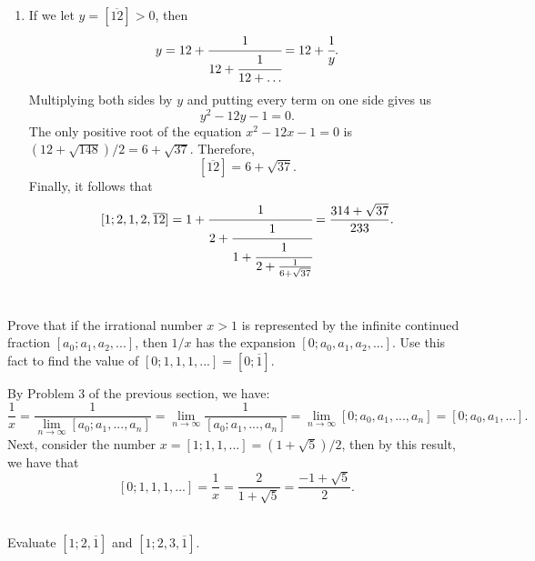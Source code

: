 \begin{solution}
\begin{enumerate}
        $$y^2 - 3y - 3 = 0.$$
        The only positive root of the equation $x^2 - 3x - 3 = 0$ is $(3 + \sqrt{21})/2$. Therefore, 
        $$[\overline{3, 1}] = \frac{3 + \sqrt{21}}{2}.$$
        Finally, it follows that
        $$[1; 2, \overline{3, 1}] = 1 + \cfrac{1}{2 + \frac{1}{[\overline{3, 1}]}} = 1 + \cfrac{1}{2 + \frac{2}{3 + \sqrt{21}}} = \frac{19 - \sqrt{21}}{10}.$$
        \item If we let $y = [\overline{12}] > 0$, then
        $$y = 12 + \cfrac{1}{12 + \cfrac{1}{12 + \dots}} = 12 + \cfrac{1}{y}.$$
        Multiplying both sides by $y$ and putting every term on one side gives us
        $$y^2 - 12y - 1 = 0.$$
        The only positive root of the equation $x^2 - 12x - 1 = 0$ is $(12 + \sqrt{148})/2 = 6 + \sqrt{37}$. Therefore, 
        $$[\overline{12}] = 6 + \sqrt{37}.$$
        Finally, it follows that
        $$[1; 2, 1, 2, \overline{12}] = 1 + \cfrac{1}{
            2 + \cfrac{1}{
                1 + \cfrac{1}{
                    2 + \frac{1}{6 + \sqrt{37}}
                }
            }
        } = \frac{314 + \sqrt{37}}{233}.$$\\
    \end{enumerate}
\end{solution}

\begin{exercise}
    Prove that if the irrational number $x > 1$ is represented by the infinite continued fraction $[a_0; a_1, a_2, ...]$, then $1/x$ has the expansion $[0; a_0, a_1, a_2, ...]$. Use this fact to find the value of $[0; 1, 1, 1, ...] = [0; \overline{1}]$. \\
\end{exercise}

\begin{solution}
    By Problem 3 of the previous section, we have:
    $$\frac{1}{x} = \frac{1}{\lim_{n \rightarrow \infty}[a_0; a_1, ..., a_n]} = \lim_{n \rightarrow \infty} \frac{1}{[a_0; a_1, ..., a_n]} = \lim_{n \rightarrow \infty} [0; a_0, a_1, ..., a_n] = [0; a_0, a_1, ...].$$
    Next, consider the number $x = [1; 1, 1, ...] = (1+ \sqrt{5})/2$, then by this result, we have that
    $$[0; 1, 1, 1, ...] = \frac{1}{x} = \frac{2}{1 + \sqrt{5}} = \frac{-1 + \sqrt{5}}{2}.$$ \\
\end{solution}

\begin{exercise}
    Evaluate $[1; 2, \overline{1}]$ and $[1; 2, 3, \overline{1}]$. \\
\end{exercise}

